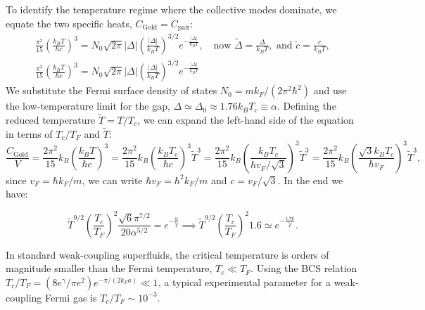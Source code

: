 To identify the temperature regime where the collective modes dominate, we equate the two specific heats, \( C_{\text{Gold}} = C_{\text{pair}} \):
\[
    \begin{aligned}
        \frac{\pi^2}{15} \left( \frac{k_B T}{\hbar c} \right)^3 = N_0 \sqrt{2\pi} |\Delta| \left( \frac{|\Delta|}{k_B T} \right)^{3/2} e^{-\frac{|\Delta|}{k_B T}}, \quad \text{now } \tilde{\Delta} = \frac{\Delta}{k_B T}, \text{ and } \tilde{c} = \frac{c}{k_B T}, \\
        \frac{\pi^2}{15} \left( \frac{k_B T}{\hbar c} \right)^3 = N_0 \sqrt{2\pi} |\Delta| \left( \frac{|\Delta|}{k_B T} \right)^{3/2} e^{-\frac{|\Delta|}{k_B T}}
    \end{aligned}
\]
We substitute the Fermi surface density of states \( N_0 = m k_F / (2\pi^2 \hbar^2) \) and use the low-temperature limit for the gap, \( \Delta \simeq \Delta_0 \approx 1.76 k_B T_c \equiv \alpha \). Defining the reduced temperature \( \tilde{T} = T/T_c \), we can expand the left-hand side of the equation in terms of \( T_c/T_F \) and \( \tilde{T} \):
\[
    \frac{C_{\text{Gold}}}{V} = \frac{2\pi^2}{15} k_B \left( \frac{k_B T}{\hbar c} \right)^3 = \frac{2\pi^2}{15} k_B \left( \frac{k_B T_c}{\hbar c} \right)^3 \tilde{T}^3 = \frac{2\pi^2}{15} k_B \left( \frac{k_B T_c}{\hbar v_F / \sqrt{3}} \right)^3 \tilde{T}^3 = \frac{2\pi^2}{15} k_B \left( \frac{\sqrt{3} k_B T_c}{\hbar v_F} \right)^3 \tilde{T}^3,
\]
since \( v_F = \hbar k_F / m \), we can write \( \hbar v_F = \hbar^2 k_F / m \) and \(c = v_F / \sqrt{3} \). In the end we have:

\begin{equation} \label{eq:specific_heat_intersection}
    \tilde{T}^{9/2} \left( \frac{T_c}{T_F} \right)^2 \frac{\sqrt{6}\pi^{7/2}}{20 \alpha^{5/2}} = e^{-\frac{\alpha}{\tilde{T}}} \implies \tilde{T}^{9/2} \left( \frac{T_c}{T_F} \right)^2 1.6 \simeq e^{-\frac{1.76}{\tilde{T}}}.
\end{equation}

In standard weak-coupling superfluids, the critical temperature is orders of magnitude smaller than the Fermi temperature, \( T_c \ll T_F \). Using the BCS relation \( T_c/T_F = (8e^\gamma/\pi e^2) e^{-\pi/(2k_F a)} \ll 1 \), a typical experimental parameter for a weak-coupling Fermi gas is \( T_c/T_F \sim 10^{-3} \).


